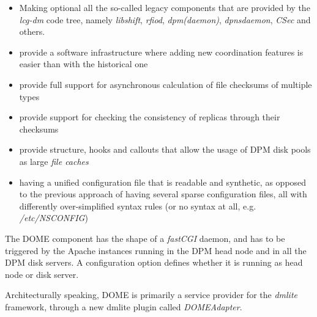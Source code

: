 \documentclass[a4paper]{jpconf}
\begin{document}
\begin{itemize}
 \item Making optional all the so-called legacy components that are provided by the \textit{lcg-dm} code tree, namely \textit{libshift}, \textit{rfiod},
 \textit{dpm(daemon)}, \textit{dpnsdaemon}, \textit{CSec} and others.
 \item provide a software infrastructure where adding new coordination features is easier than with the historical one
 \item provide full support for asynchronous calculation of file checksums of multiple types
 \item provide support for checking the consistency of replicas through their checksums
 \item provide structure, hooks and callouts that allow the usage of DPM disk pools as large \textit{file caches}
 \item having a unified configuration file that is readable and synthetic, as opposed to the previous approach of having several
 sparse configuration files, all with differently over-simplified syntax rules (or no syntax at all, e.g. \textit{/etc/NSCONFIG})
\end{itemize}

The DOME component has the shape of a \textit{fastCGI} daemon, and has to be triggered by the Apache instances running in the DPM head node and
in all the DPM disk servers. A configuration option defines whether it is running as head node or disk server.

Architecturally speaking, DOME is primarily a service provider for the \textit{dmlite} framework, through a new dmlite plugin called \textit{DOMEAdapter}.\\
\end{document}
